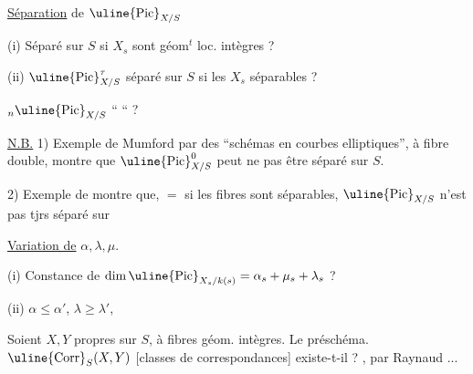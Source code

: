 \uline{Séparation} de $\uline{\mathrm{Pic}}_{X/S}$

(i) Séparé sur $S$ si $X_s$ sont géom$^t$ loc. intègres ?

(ii) $\uline{\mathrm{Pic}}^\tau_{X/S}$ séparé sur $S$ si les $X_s$ séparables ?

${}_n\uline{\mathrm{Pic}}_{X/S}$ \qquad `` \qquad `` \qquad ?

\uline{N.B.} 1) Exemple de Mumford par des ``schémas en courbes elliptiques'', à fibre double, montre que $\uline{\mathrm{Pic}}^0_{X/S}$ peut ne pas être séparé sur $S$.

2) Exemple de
montre que, $=$ si les fibres sont séparables, $\uline{\mathrm{Pic}}_{X/S}$ n'est pas tjrs  séparé sur 

\uline{Variation de} $\alpha,\lambda,\mu$.

(i) Constance de $\dim\uline{\mathrm{Pic}}_{X_s/k(s)}=\alpha_s+\mu_s+\lambda_s$ ?

(ii) $\alpha\leq\alpha'$, $\lambda\geq\lambda'$, 


Soient $X,Y$ propres sur $S$, à fibres géom. intègres. Le préschéma. $\uline{\mathrm{Corr}}_S(X,Y)$ [classes de correspondances] existe-t-il ? , par Raynaud ...
